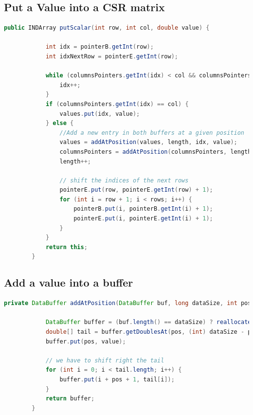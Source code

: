 	\subsection{Put a Value into a CSR matrix}
		\begin{lstlisting}[caption=Put a new value into a CSR array\label{lst:putcsc},language=Java]
		public INDArray putScalar(int row, int col, double value) {
		
			int idx = pointerB.getInt(row);
			int idxNextRow = pointerE.getInt(row);
			
			while (columnsPointers.getInt(idx) < col && columnsPointers.getInt(idx) < idxNextRow) {
				idx++;
			}
			if (columnsPointers.getInt(idx) == col) {
				values.put(idx, value);
			} else {
				//Add a new entry in both buffers at a given position
				values = addAtPosition(values, length, idx, value);
				columnsPointers = addAtPosition(columnsPointers, length, idx, col);
				length++;
				
				// shift the indices of the next rows
				pointerE.put(row, pointerE.getInt(row) + 1);
				for (int i = row + 1; i < rows; i++) {
					pointerB.put(i, pointerB.getInt(i) + 1);
					pointerE.put(i, pointerE.getInt(i) + 1);
				}
			}
			return this;
		}
		\end{lstlisting}
		
		\subsection{Add a value into a buffer}
		\begin{lstlisting}[caption=Add a value into a buffer\label{lst:addBuff},language=Java]
		private DataBuffer addAtPosition(DataBuffer buf, long dataSize, int pos, double value) {
		
			DataBuffer buffer = (buf.length() == dataSize) ? reallocate(buf) : buf;
			double[] tail = buffer.getDoublesAt(pos, (int) dataSize - pos);
			buffer.put(pos, value);
			
			// we have to shift right the tail
			for (int i = 0; i < tail.length; i++) {
				buffer.put(i + pos + 1, tail[i]);
			}
			return buffer;
		}
		
		\end{lstlisting}
